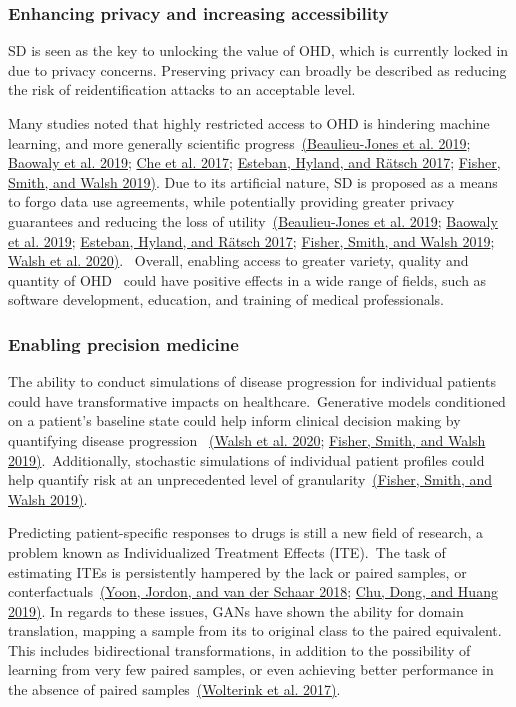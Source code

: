 \documentclass[10pt]{article}
\begin{document}
\subsubsection{Enhancing privacy and increasing
accessibility}

{\label{779569}}

SD is seen as the key to unlocking the value of OHD, which is currently
locked in due to privacy concerns. Preserving privacy can broadly be
described as reducing the risk of reidentification attacks to an
acceptable level.

Many studies noted that highly restricted access to OHD is hindering
machine learning, and more generally scientific
progress~\hyperref[csl:16]{(Beaulieu-Jones et al. 2019}; \hyperref[csl:29]{Baowaly et al. 2019}; \hyperref[csl:15]{Che et al. 2017}; \hyperref[csl:5]{Esteban, Hyland, and R{\"a}tsch 2017}; \hyperref[csl:10]{Fisher, Smith, and Walsh 2019)}. Due to its artificial nature, SD is
proposed as a means to forgo data use agreements, while potentially
providing greater privacy guarantees and reducing the loss of
utility~\hyperref[csl:16]{(Beaulieu-Jones et al. 2019}; \hyperref[csl:29]{Baowaly et al. 2019}; \hyperref[csl:5]{Esteban, Hyland, and R{\"a}tsch 2017}; \hyperref[csl:10]{Fisher, Smith, and Walsh 2019}; \hyperref[csl:12]{Walsh et al. 2020)}.~ Overall, enabling access to greater
variety, quality and quantity of OHD~ could have positive effects in a
wide range of fields, such as software development, education, and
training of medical professionals.~

\subsubsection{Enabling precision
medicine}

{\label{406097}}

The ability to conduct simulations of disease progression for individual
patients could have transformative impacts on healthcare.~Generative
models conditioned on a patient's baseline state could help inform
clinical decision making by quantifying disease progression
~\hyperref[csl:12]{(Walsh et al. 2020}; \hyperref[csl:10]{Fisher, Smith, and Walsh 2019)}.~Additionally, stochastic simulations of individual
patient profiles could help quantify risk at an unprecedented level of
granularity~\hyperref[csl:10]{(Fisher, Smith, and Walsh 2019)}.~ ~

Predicting patient-specific responses to drugs is still a new field of
research, a problem known as Individualized Treatment Effects (ITE).~The
task of estimating ITEs is persistently hampered by the lack or paired
samples, or conterfactuals~\hyperref[csl:21]{(Yoon, Jordon, and van der Schaar 2018}; \hyperref[csl:26]{Chu, Dong, and Huang 2019)}. In regards to these
issues, GANs have shown the ability for domain translation, mapping a
sample from its to original class to the paired equivalent. This
includes bidirectional transformations, in addition to the possibility
of learning from very few paired samples, or even achieving better
performance in the absence of paired samples~\hyperref[csl:39]{(Wolterink et al. 2017)}.~
\end{document}
